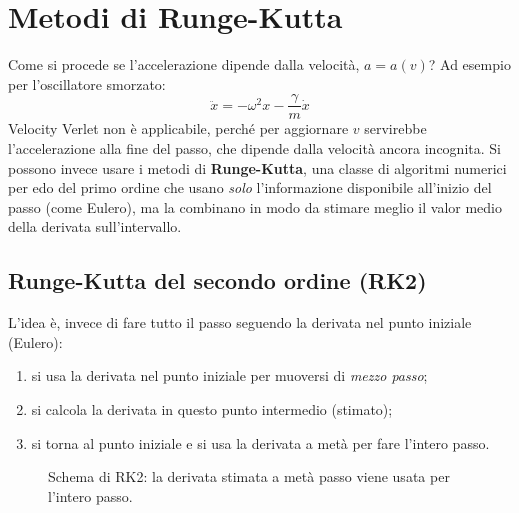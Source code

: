 \documentclass[11pt, a4paper, openright]{book}
\theoremstyle{plain}
\theoremstyle{definition}
\theoremstyle{remark}
\begin{document}
\section{Metodi di Runge-Kutta}
Come si procede se l'accelerazione dipende dalla velocità, $a = a(v)$? Ad esempio per l'oscillatore smorzato:
\begin{equation}
    \ddot{x} = -\omega^2x - \frac{\gamma}{m}\dot{x}
\end{equation}
Velocity Verlet non è applicabile, perché per aggiornare $v$ servirebbe l'accelerazione alla fine del passo, che dipende dalla velocità ancora incognita. Si possono invece usare i metodi di \textbf{Runge-Kutta}, una classe di algoritmi numerici per edo del primo ordine che usano \emph{solo} l'informazione disponibile all'inizio del passo (come Eulero), ma la combinano in modo da stimare meglio il valor medio della derivata sull'intervallo.

\subsection{Runge-Kutta del secondo ordine (RK2)}
L'idea è, invece di fare tutto il passo seguendo la derivata nel punto iniziale (Eulero):
\begin{enumerate}
    \item si usa la derivata nel punto iniziale per muoversi di \emph{mezzo passo};
    \item si calcola la derivata in questo punto intermedio (stimato);
    \item si torna al punto iniziale e si usa la derivata a metà per fare l'intero passo.
\end{enumerate}

\begin{figure}[H]
    \centering
    \caption{Schema di RK2: la derivata stimata a metà passo viene usata per l'intero passo.}
\end{figure}
\end{document}
